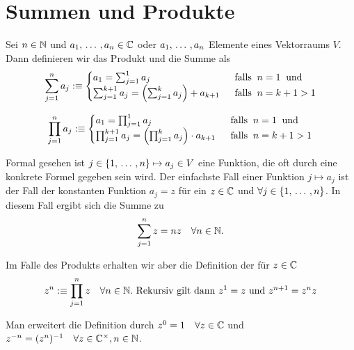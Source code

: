 \section{Summen und Produkte}
\begin{mydef-non}
  Sei $n\in \mathbb{N}$ und $a_1, {\, \ldots \,\,}, a_n \in \mathbb{C}$ oder $a_1, {\, \ldots \,\,}, a_n$ Elemente eines Vektorraums $V$. Dann definieren wir das Produkt und die Summe als
\[
  \sum_{j=1}^{n} a_j
  :\equiv
  \begin{cases}
    a_1=\sum_{j=1}^{1}a_j & \;\; \text{falls}\;\; n=1 \;\; \text{und}\;\; \\
    \sum_{j=1}^{k+1}a_j = \left(\sum_{j=1}^{k} a_j \right) + a_{k+1} & \;\; \text{falls}\;\; n = k+1 > 1
  \end{cases}
\]

\[
\prod_{j=1}^{n} a_j
:\equiv
\begin{cases}
  a_1=\prod_{j=1}^{1}a_j & \;\; \text{falls}\;\; n=1 \;\; \text{und}\;\; \\
  \prod_{j=1}^{k+1}a_j = \left(\prod_{j=1}^{k} a_j \right) \cdot a_{k+1} & \;\; \text{falls}\;\; n = k+1 > 1
\end{cases}
\]
\end{mydef-non}

Formal gesehen ist $j \in \{1, {\, \ldots \,\,}, n\} \mapsto a_j \in V$ eine Funktion, die oft durch eine konkrete Formel gegeben sein wird.
Der einfachste Fall einer Funktion $j \mapsto a_j$ ist der Fall der konstanten Funktion $a_j = z$ für ein $z \in \mathbb{C}$ und $\forall j \in \{1, {\, \ldots \,\,}, n\}$. In diesem Fall ergibt sich die Summe zu
\[
\sum_{j=1}^{n}z = nz \quad \forall n \in
 \mathbb{N}.
\]

\begin{mydef-non}
  Im Falle des Produkts erhalten wir aber die Definition der  für $z \in \mathbb{C}$
\[
z^n :\equiv \prod_{j=1}^{n}z \quad \forall n \in \nat. $ Rekursiv gilt dann $ z^1 =z $ und $ z^{n+1} = z^n z
\]\end{mydef-non}

Man erweitert die Definition durch $z^0=1 \quad \forall z \in \mathbb{C}$ und $z^{-n} = (z^n)^{-1} \quad \forall z \in \mathbb{C} ^ \times, n \in \mathbb{N}$.

